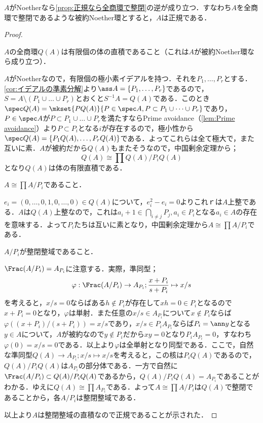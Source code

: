 \begin{thm}
	$A$がNoetherなら\ref{prop:正規なら全商環で整閉}の逆が成り立つ．すなわち$A$を全商環で整閉であるような被約Noether環とすると，$A$は正規である．
\end{thm}

\begin{proof}
	\begin{step}
		\item $A$の全商環$Q(A)$は有限個の体の直積であること（これは$A$が被約Noether環なら成り立つ）．
		
		$A$がNoetherなので，有限個の極小素イデアルを持つ．それを$P_1,\dots,P_r$とする．\ref{cor:イデアルの準素分解}より$\ass A=\{P_1,\dots,P_r\}$であるので，$S=A\setminus(P_1\cup\dots\cup P_r)$とおくと$S^{-1}A=Q(A)$である．このとき$\spec Q(A)=\mkset{PQ(A)}{P\in\spec A,P\subset P_1\cup\dots\cup P_r}$であり，$P\in\spec A$が$P\subset P_1\cup\dots\cup P_r$を満たすならPrime avoidance（\ref{lem:Prime avoidance}）より$P\subset P_i$となる$i$が存在するので，極小性から$\spec Q(A)=\{P_1Q(A),\dots,P_rQ(A)\}$である．よってこれらは全て極大で，また互いに素．$A$が被約だから$Q(A)$もまたそうなので，中国剰余定理から；
		\[Q(A)\cong\prod Q(A)/P_iQ(A)\]
		となり$Q(A)$は体の有限直積である．
		
		\item $A\cong\prod A/P_i$であること．
		
		$e_i=(0,\dots,0,1,0,\dots,0)\in Q(A)$について，$e_i^2-e_i=0$よりこれｒは$A$上整である．$A$は$Q(A)$上整なので，これは$a_i+1\in\bigcap_{i\neq j}P_j,a_i\in P_i$となる$a_i\in A$の存在を意味する．よって$P_i$たちは互いに素となり，中国剰余定理から$A\cong\prod A/P_i$である．
		
		\item $A/P_i$が整閉整域であること．
		
		$\Frac(A/P_i)=A_{P_i}$に注意する．実際，準同型；
		\[\varphi:\Frac(A/P_i)\to A_{P_i};\frac{x+P_i}{s+P_i}\mapsto x/s\]
		を考えると，$x/s=0$ならばある$h\not\in P_i$が存在して$xh=0\in P_i$となるので$x+P_i=0$となり，$\varphi$は単射．また任意の$x/s\in A_{P_i}$について$x\not\in P_i$ならば$\varphi((x+P_i)/(s+P_i))=x/s$であり，$x/s\in P_iA_{P_i}$ならば$P_i=\ann y$となる$y\in A$について，$A$が被約なので$y\not\in P_i$だから$xy=0$となり$P_iA_{P_i}=0$，すなわち$\varphi(0)=x/s=0$である．以上より$\varphi$は全単射となり同型である．ここで，自然な準同型$Q(A)\to A_{P_i};x/s\mapsto x/s$を考えると，この核は$P_iQ(A)$であるので，$Q(A)/P_iQ(A)$は$A_{P_i}$の部分体である．一方で自然に$\Frac(A/P_i)\subset Q(A)/P_iQ(A)$であるから，$Q(A)/P_iQ(A)=A_{P_i}$であることがわかる．ゆえに$Q(A)\cong\prod A_{P_i}$である．よって$A\cong\prod A/P_i$は$Q(A)$で整閉であることから，各$A/P_i$は整閉整域である．
	\end{step}
	以上より$A$は整閉整域の直積なので正規であることが示された．
\end{proof}
